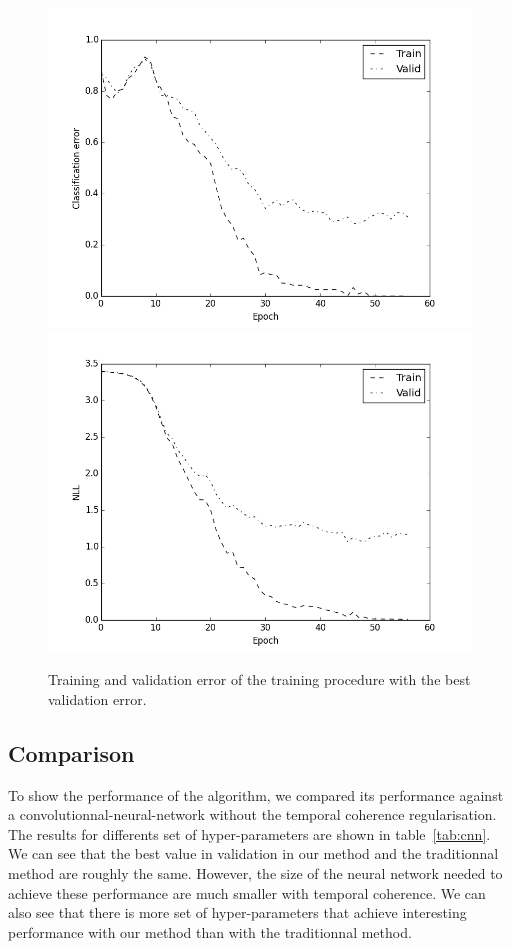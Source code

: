 \begin{figure}[htbf]
\label{fig:results_bestrun}
\includegraphics[scale=0.35]{result1.png} 
\includegraphics[scale=0.35]{result2.png} 
\caption{Training and validation error of the training procedure with the best validation error.}
\end{figure}

\subsection{Comparison}

To show the performance of the algorithm, we compared its performance against a convolutionnal-neural-network without the temporal coherence regularisation. The results for differents set of hyper-parameters are shown in table~\ref{tab:cnn}. We can see that the best value in validation in our method and the traditionnal method are roughly the same. However, the size of the neural network needed to achieve these performance are much smaller with temporal coherence. We can also see that there is more set of hyper-parameters that achieve interesting performance with our method than with the traditionnal method.


